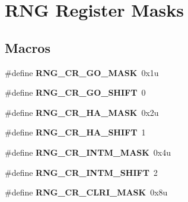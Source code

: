 \hypertarget{group__RNG__Register__Masks}{}\section{R\+NG Register Masks}
\label{group__RNG__Register__Masks}
\subsection*{Macros}
\begin{DoxyCompactItemize}
\item 
\#define {\bfseries R\+N\+G\+\_\+\+C\+R\+\_\+\+G\+O\+\_\+\+M\+A\+SK}~0x1u\hypertarget{group__RNG__Register__Masks_ga2aebfd44952b9acb9854f17cbb241dc3}{}\label{group__RNG__Register__Masks_ga2aebfd44952b9acb9854f17cbb241dc3}

\item 
\#define {\bfseries R\+N\+G\+\_\+\+C\+R\+\_\+\+G\+O\+\_\+\+S\+H\+I\+FT}~0\hypertarget{group__RNG__Register__Masks_ga33164b67927c62a20a5cc0ebf24a6dec}{}\label{group__RNG__Register__Masks_ga33164b67927c62a20a5cc0ebf24a6dec}

\item 
\#define {\bfseries R\+N\+G\+\_\+\+C\+R\+\_\+\+H\+A\+\_\+\+M\+A\+SK}~0x2u\hypertarget{group__RNG__Register__Masks_ga771a9a36a3856ec15886952dd5881e67}{}\label{group__RNG__Register__Masks_ga771a9a36a3856ec15886952dd5881e67}

\item 
\#define {\bfseries R\+N\+G\+\_\+\+C\+R\+\_\+\+H\+A\+\_\+\+S\+H\+I\+FT}~1\hypertarget{group__RNG__Register__Masks_ga003221e3c2c56d155f0144d99b9daa28}{}\label{group__RNG__Register__Masks_ga003221e3c2c56d155f0144d99b9daa28}

\item 
\#define {\bfseries R\+N\+G\+\_\+\+C\+R\+\_\+\+I\+N\+T\+M\+\_\+\+M\+A\+SK}~0x4u\hypertarget{group__RNG__Register__Masks_gaeb6ea10a08f7c854d7a2d566afbc509a}{}\label{group__RNG__Register__Masks_gaeb6ea10a08f7c854d7a2d566afbc509a}

\item 
\#define {\bfseries R\+N\+G\+\_\+\+C\+R\+\_\+\+I\+N\+T\+M\+\_\+\+S\+H\+I\+FT}~2\hypertarget{group__RNG__Register__Masks_ga3e492e16a9a75e903cc108e526b51d7f}{}\label{group__RNG__Register__Masks_ga3e492e16a9a75e903cc108e526b51d7f}

\item 
\#define {\bfseries R\+N\+G\+\_\+\+C\+R\+\_\+\+C\+L\+R\+I\+\_\+\+M\+A\+SK}~0x8u\hypertarget{group__RNG__Register__Masks_gabe50fd44817cb9fbdf15fc9f832bfafa}{}\label{group__RNG__Register__Masks_gabe50fd44817cb9fbdf15fc9f832bfafa}


\end{DoxyCompactItemize}
